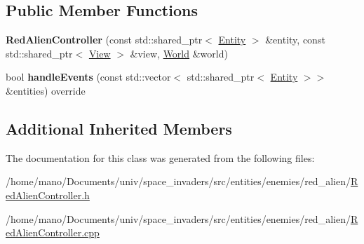 \subsection*{Public Member Functions}
\begin{DoxyCompactItemize}
\item 
\mbox{\label{classentities_1_1enemies_1_1red__alien_1_1RedAlienController_aebe17931bfbc588e09390846417684d5}} 
{\bfseries Red\+Alien\+Controller} (const std\+::shared\+\_\+ptr$<$ \hyperlink{classentities_1_1Entity}{Entity} $>$ \&entity, const std\+::shared\+\_\+ptr$<$ \hyperlink{classentities_1_1View}{View} $>$ \&view, \hyperlink{classWorld}{World} \&world)
\item 
\mbox{\label{classentities_1_1enemies_1_1red__alien_1_1RedAlienController_a60cd9e9d872c44c28827316255298e33}} 
bool {\bfseries handle\+Events} (const std\+::vector$<$ std\+::shared\+\_\+ptr$<$ \hyperlink{classentities_1_1Entity}{Entity} $>$$>$ \&entities) override
\end{DoxyCompactItemize}
\subsection*{Additional Inherited Members}


The documentation for this class was generated from the following files\+:\begin{DoxyCompactItemize}
\item 
/home/mano/\+Documents/univ/space\+\_\+invaders/src/entities/enemies/red\+\_\+alien/\hyperlink{RedAlienController_8h}{Red\+Alien\+Controller.\+h}\item 
/home/mano/\+Documents/univ/space\+\_\+invaders/src/entities/enemies/red\+\_\+alien/\hyperlink{RedAlienController_8cpp}{Red\+Alien\+Controller.\+cpp}\end{DoxyCompactItemize}

